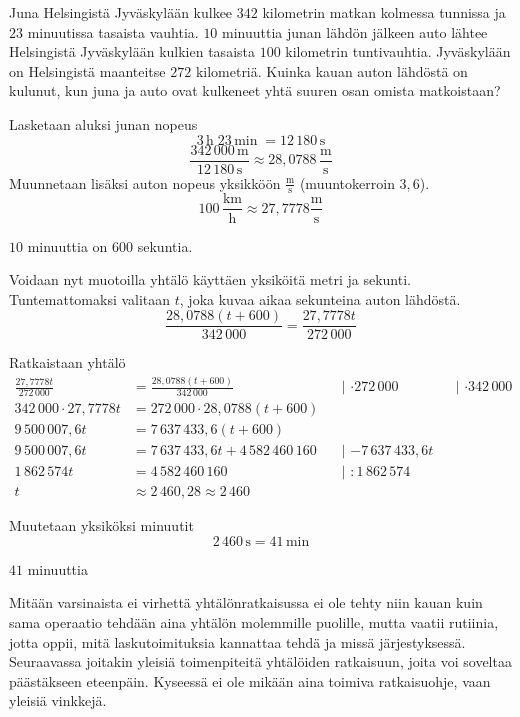 \begin{esimerkki}
Juna Helsingistä Jyväskylään kulkee $342$ kilometrin matkan kolmessa tunnissa ja $23$ minuutissa tasaista vauhtia. $10$ minuuttia junan lähdön jälkeen auto lähtee Helsingistä Jyväskylään kulkien tasaista $100$ kilometrin tuntivauhtia. Jyväskylään on Helsingistä maanteitse $272$ kilometriä. Kuinka kauan auton lähdöstä on kulunut, kun juna ja auto ovat kulkeneet yhtä suuren osan omista matkoistaan?
	\begin{esimratk}
		Lasketaan aluksi junan nopeus
		\[3\,\text{h} \; 23\,\text{min} \; = 12\,180\,\text{s} \]
		\[\frac{342\,000\,\text{m}}{12\,180\,\text{s}} \approx  28,0788\,\frac{\text{m}}{\text{s}} \]
		Muunnetaan lisäksi auton nopeus yksikköön $\frac{\text{m}}{\text{s}}$ (muuntokerroin $3,6$).
		\[100\,\frac{\text{km}}{\text{h}} \approx 27,7778 \frac{\text{m}}{\text{s}} \]
		
		$10$ minuuttia on $600$ sekuntia.
		
		Voidaan nyt muotoilla yhtälö käyttäen yksiköitä metri ja sekunti. Tuntemattomaksi valitaan $t$, joka kuvaa aikaa sekunteina auton lähdöstä.
		\[ \frac{28,0788(t+600)}{342\,000} = \frac{27,7778t}{272\,000} \]
		
		Ratkaistaan yhtälö
		\begin{align*}
			\frac{27,7778t}{272\,000} &= \frac{28,0788(t+600)}{342\,000} &&\text{| $\cdot{272\,000}$} &&\text{| $\cdot{342\,000}$}  \\
			342\,000 \cdot 27,7778t &= 272\,000 \cdot 28,0788(t+600) \\
			9\,500\,007,6t &= 7\,637\,433,6(t+600) \\
			9\,500\,007,6t &= 7\,637\,433,6t + 4\,582\,460\,160 &&\text{| $-7\,637\,433,6t$} \\ 
			1\,862\,574t &= 4\,582\,460\,160 &&\text{| $:{1\,862\,574}$} \\
			t &\approx 2\,460,28 \approx 2\,460
		\end{align*}
		
		Muutetaan yksiköksi minuutit
		\[2\,460\,\text{s}=41\,\text{min}\]
	\end{esimratk}
	\begin{esimvast}
		$41$ minuuttia
	\end{esimvast}
\end{esimerkki}

Mitään varsinaista ei virhettä yhtälönratkaisussa ei ole tehty niin kauan kuin sama operaatio tehdään aina yhtälön molemmille puolille, mutta vaatii rutiinia, jotta oppii, mitä laskutoimituksia kannattaa tehdä ja missä järjestyksessä. Seuraavassa joitakin yleisiä toimenpiteitä yhtälöiden ratkaisuun, joita voi soveltaa päästäkseen eteenpäin. Kyseessä ei ole mikään aina toimiva ratkaisuohje, vaan yleisiä vinkkejä.

